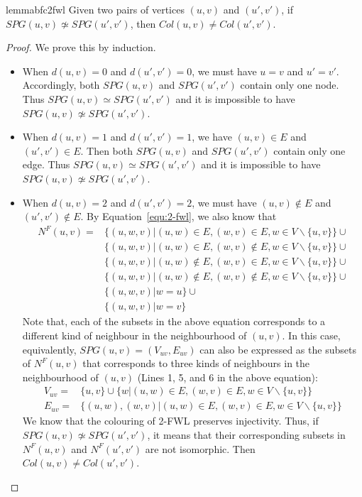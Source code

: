 \begin{restatable}[]{lemma}{bfc2fwl}
\label{lemma:bfc2fwl}
Given two pairs of vertices $(u,v)$ and $(u',v')$, if $SPG(u,v)\not\simeq SPG(u',v')$, then $Col(u,v)\neq Col(u',v')$.
\end{restatable}

\begin{proof}
We prove this by induction.

\begin{itemize}
    \item When $d(u,v)=0$ and $d(u',v')=0$, we must have $u=v$ and $u'=v'$. Accordingly, both $SPG(u,v)$ and $SPG(u',v')$ contain only one node. Thus $SPG(u,v)\simeq SPG(u',v')$ and it is impossible to have $SPG(u,v)\not\simeq SPG(u',v')$.

\item When $d(u,v)=1$ and $d(u',v')=1$, we have $(u,v)\in E$ and $(u',v')\in E$. Then both $SPG(u,v)$ and $SPG(u',v')$ contain only one edge. Thus $SPG(u,v)\simeq SPG(u',v')$ and it is impossible to have $SPG(u,v)\not\simeq SPG(u',v')$.


\item When $d(u,v)=2$ and $d(u',v')=2$, we must have $(u,v)\not\in E$ and $(u',v')\not\in E$. By Equation~\ref{equ:2-fwl}, we also know that  
\begin{align*}\label{equ:d2-2-fwl}
      N^F(u,v) = & \{(u,w,v)|(u,w)\in E,(w,v)\in E, w\in V\backslash\{u,v\}\}\cup\\&\{(u,w,v)|(u,w)\in E, (w,v)\not\in E, w\in V\backslash\{u,v\}\}\cup\\   
      &\{(u,w,v)|(u,w)\not\in E, (w,v)\in E, w\in V\backslash\{u,v\}\}\cup\\ 
      &\{(u,w,v)|(u,w)\not\in E, (w,v)\not\in E, w\in V\backslash\{u,v\}\}\cup\\ 
      &\{(u,w,v)|w=u\}\cup\\ 
      &\{(u,w,v)|w=v\} 
\end{align*}
Note that, each of the subsets in the above equation corresponds to a different kind of neighbour in the neighbourhood of $(u,v)$. In this case, equivalently, $SPG(u,v)=(V_{uv}, E_{uv})$ can also be expressed as the subsets of $N^F(u,v)$ that corresponds to three kinds of neighbours in the neighbourhood of $(u,v)$ (Lines 1, 5, and 6 in the above equation):
\begin{align*}
      V_{uv} = &\{u,v\}\cup\{w|(u,w)\in E,(w,v)\in E, w\in V\backslash\{u,v\}\}\\
      E_{uv} = & \{(u,w),(w,v)|(u,w)\in E,(w,v)\in E, w\in V\backslash\{u,v\}\}
\end{align*}
We know that the colouring of 2-FWL preserves injectivity. Thus, if $SPG(u,v)\not\simeq SPG(u',v')$, it means that their corresponding subsets in $N^F(u,v)$ and $N^F(u',v')$ are not isomorphic. Then $Col(u,v)\neq Col(u',v')$.


\end{itemize}
\end{proof}
